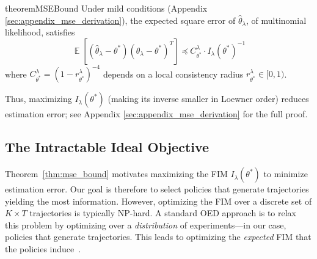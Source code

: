 \documentclass{article}
\DeclareMathOperator*{\E}{\mathbb{E}} %
\begin{document}
\begin{restatable}{theorem}{MSEBound}
\label{thm:mse_bound}
Under mild conditions (Appendix \ref{sec:appendix_mse_derivation}), the expected square error of $\hat{\theta}_\lambda$, of multinomial likelihood, satisfies
\[
\E[(\hat{\theta}_\lambda - \theta^*)(\hat{\theta}_\lambda - \theta^*)^T] \preceq C^{\lambda}_{\theta^*} \cdot I_\lambda(\theta^*)^{-1}
\]
where $C^{\lambda}_{\theta^*} = (1-r^{\lambda}_{\theta^*})^{-4}$ depends on a local consistency radius $r^{\lambda}_{\theta^*}\!\in[0,1)$.
\end{restatable}

Thus, maximizing $I_\lambda(\theta^*)$ (making its inverse smaller in Loewner order) reduces estimation error; see Appendix \ref{sec:appendix_mse_derivation} for the full proof.

\vspace{-0.2cm}\subsection{The Intractable Ideal Objective} 
\vspace{-0.2cm}Theorem~\ref{thm:mse_bound} motivates maximizing the FIM $I_\lambda(\theta^*)$ to minimize estimation error. Our goal is therefore to select policies that generate trajectories yielding the most information. However, optimizing the FIM over a discrete set of $K{\times}T$ trajectories is typically NP-hard. A standard OED approach is to relax this problem by optimizing over a \textit{distribution} of experiments---in our case, policies that generate trajectories. This leads to optimizing the \textit{expected} FIM that the policies induce~\cite{doi:10.1137/1.9780898719109, fedorov1997model}.
\end{document}
